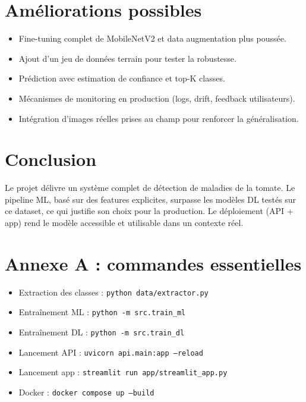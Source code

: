 \documentclass[12pt,a4paper]{article}
\begin{document}
\section{Am\'eliorations possibles}
\begin{itemize}[leftmargin=*]
    \item Fine-tuning complet de MobileNetV2 et data augmentation plus pouss\'ee.
    \item Ajout d'un jeu de donn\'ees terrain pour tester la robustesse.
    \item Pr\'ediction avec estimation de confiance et top-K classes.
    \item M\'ecanismes de monitoring en production (logs, drift, feedback utilisateurs).
    \item Int\'egration d'images r\'eelles prises au champ pour renforcer la g\'en\'eralisation.
\end{itemize}

\section{Conclusion}
Le projet d\'elivre un syst\`eme complet de d\'etection de maladies de la tomate. Le pipeline ML, bas\'e sur des features explicites, surpasse les mod\`eles DL test\'es sur ce dataset, ce qui justifie son choix pour la production. Le d\'eploiement (API + app) rend le mod\`ele accessible et utilisable dans un contexte r\'eel.

\section*{Annexe A : commandes essentielles}
\begin{itemize}[leftmargin=*]
    \item Extraction des classes : \texttt{python data/extractor.py}
    \item Entra\^inement ML : \texttt{python -m src.train\_ml}
    \item Entra\^inement DL : \texttt{python -m src.train\_dl}
    \item Lancement API : \texttt{uvicorn api.main:app --reload}
    \item Lancement app : \texttt{streamlit run app/streamlit\_app.py}
    \item Docker : \texttt{docker compose up --build}
\end{itemize}
\end{document}
